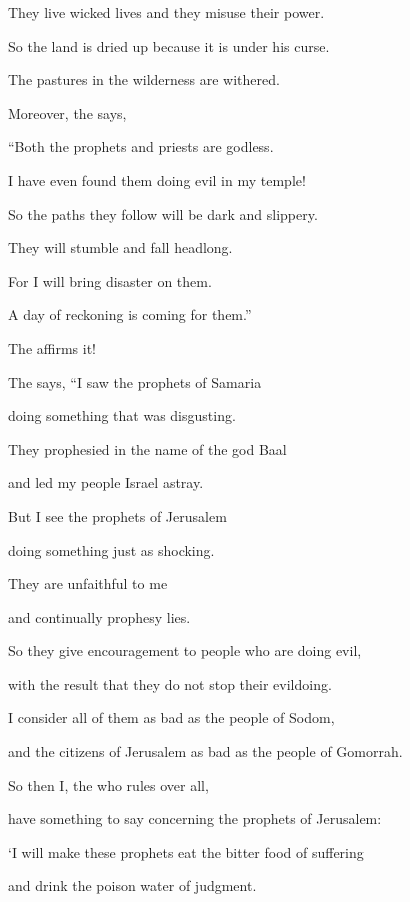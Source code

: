 {\par }{\Q They live wicked
lives
and they misuse their power.
\par }{\Q So the land
is dried up
because
it is under
his curse.
\par }{\Q The pastures
in the wilderness
are withered.
\par }{\Q {}Moreover,
the {}
says,
\par }{\Q “Both
the prophets
and priests
are godless.
\par }{\Q I have even
found
them doing evil
in my temple!
\par }{\Q {}So
the paths
they
follow
will be dark
and slippery.
\par }{\Q They will stumble and fall
headlong.
\par }{\Q For
I will bring
disaster
on
them.
\par }{\Q A day
of reckoning
is coming for them.”

\par }{\Q The
{}
affirms it!
\par }{\Q {}The
{} says, “I saw
the prophets
of Samaria
\par }{\Q doing something that was disgusting.
\par }{\Q They prophesied
in the name of the god Baal
\par }{\Q and led my people
Israel
astray.
\par }{\Q {}But I see
the prophets
of Jerusalem
\par }{\Q doing something
just as shocking.
\par }{\Q They are unfaithful
to me
\par }{\Q and continually prophesy
lies.
\par }{\Q So they give encouragement
to people who are doing evil,
\par }{\Q with the result that they do not
stop their evildoing.
\par }{\Q I consider all
of them as bad as the people of Sodom,
\par }{\Q and the citizens
of Jerusalem as bad as the people of Gomorrah.
\par }{\Q {}So
then I,
the {}
who rules over all,
\par }{\Q have something to say concerning
the prophets
of Jerusalem:

\par }{\Q ‘I will make
these prophets eat
the
bitter food of suffering
\par }{\Q and drink
the poison
water
of judgment.

}
